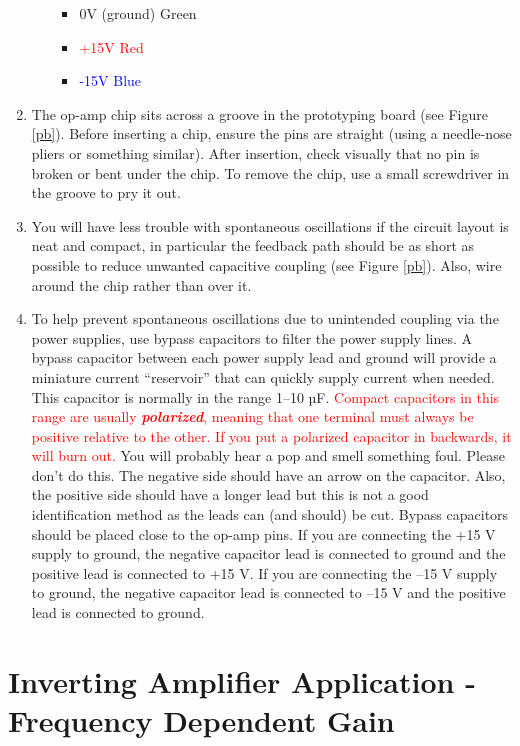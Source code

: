 \documentclass[10pt]{PhysLab1C} %
\begin{document}
\begin{enumerate}
\begin{enumerate}
    \begin{itemize}
    \item
      \textcolor{OliveGreen}{0V (ground) Green}
    \item
      \textcolor{red}{+15V Red}
    \item
      \textcolor{blue}{-15V Blue}
    \end{itemize}
  \end{enumerate}
\item
  The op-amp chip sits across a groove in the prototyping board (see Figure \ref{pb}). Before inserting a chip, ensure the pins are straight (using a
  needle-nose pliers or something similar). After insertion, check
  visually that no pin is broken or bent under the chip. To remove the
  chip, use a small screwdriver in the groove to pry it out.
\item
  You will have less trouble with spontaneous oscillations if the
  circuit layout is neat and compact, in particular the feedback path
  should be as short as possible to reduce unwanted capacitive coupling
  (see Figure \ref{pb}). Also, wire around the chip rather than over it.
\item
  To help prevent spontaneous oscillations due to unintended coupling
  via the power supplies, use bypass capacitors to filter the power
  supply lines. A bypass capacitor between each power supply lead and
  ground will provide a miniature current ``reservoir'' that can quickly
  supply current when needed. This capacitor is normally in the range
  1--10 µF. \textcolor{red}{Compact capacitors in this range are usually
  \emph{\textbf{polarized}}, meaning that one terminal must always be
  positive relative to the other. If you put a polarized capacitor in
  backwards, it will burn out.} You will probably hear a pop and smell
  something foul. Please don't do this. The negative side should have an
  arrow on the capacitor. Also, the positive side should have a longer
  lead but this is not a good identification method as the leads can
  (and should) be cut. Bypass capacitors should be placed close to the
  op-amp pins. If you are connecting the +15 V supply to ground, the
  negative capacitor lead is connected to ground and the positive lead
  is connected to +15 V. If you are connecting the --15 V supply to
  ground, the negative capacitor lead is connected to --15 V and the
  positive lead is connected to ground.
\end{enumerate}

\section{Inverting Amplifier Application - Frequency Dependent Gain}
\end{document}
